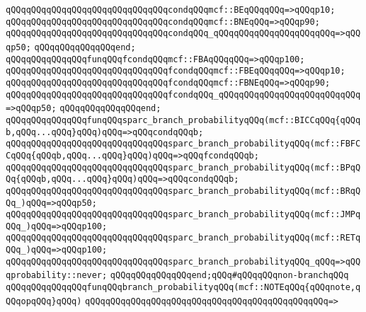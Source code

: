\verb|qQQqqQQqqQQqqQQqqQQqqQQqqQQqqQQqcondqQQqmcf::BEqQQqqQQq=>qQQqp10;|\newline
\verb|qQQqqQQqqQQqqQQqqQQqqQQqqQQqqQQqcondqQQqmcf::BNEqQQq=>qQQqp90;|\newline
\verb|qQQqqQQqqQQqqQQqqQQqqQQqqQQqqQQqcondqQQq_qQQqqQQqqQQqqQQqqQQqqQQq=>qQQqp50;|\newline
\verb|qQQqqQQqqQQqqQQqend;|\newline
\newline
\verb|qQQqqQQqqQQqqQQqfunqQQqfcondqQQqmcf::FBAqQQqqQQq=>qQQqp100;|\newline
\verb|qQQqqQQqqQQqqQQqqQQqqQQqqQQqqQQqfcondqQQqmcf::FBEqQQqqQQq=>qQQqp10;|\newline
\verb|qQQqqQQqqQQqqQQqqQQqqQQqqQQqqQQqfcondqQQqmcf::FBNEqQQq=>qQQqp90;|\newline
\verb|qQQqqQQqqQQqqQQqqQQqqQQqqQQqqQQqfcondqQQq_qQQqqQQqqQQqqQQqqQQqqQQqqQQq=>qQQqp50;|\newline
\verb|qQQqqQQqqQQqqQQqend;|\newline
\newline
\verb|qQQqqQQqqQQqqQQqfunqQQqsparc_branch_probabilityqQQq(mcf::BICCqQQq{qQQqb,qQQq...qQQq}qQQq)qQQq=>qQQqcondqQQqb;|\newline
\verb|qQQqqQQqqQQqqQQqqQQqqQQqqQQqqQQqsparc_branch_probabilityqQQq(mcf::FBFCCqQQq{qQQqb,qQQq...qQQq}qQQq)qQQq=>qQQqfcondqQQqb;|\newline
\verb|qQQqqQQqqQQqqQQqqQQqqQQqqQQqqQQqsparc_branch_probabilityqQQq(mcf::BPqQQq{qQQqb,qQQq...qQQq}qQQq)qQQq=>qQQqcondqQQqb;|\newline
\verb|qQQqqQQqqQQqqQQqqQQqqQQqqQQqqQQqsparc_branch_probabilityqQQq(mcf::BRqQQq_)qQQq=>qQQqp50;|\newline
\verb|qQQqqQQqqQQqqQQqqQQqqQQqqQQqqQQqsparc_branch_probabilityqQQq(mcf::JMPqQQq_)qQQq=>qQQqp100;|\newline
\verb|qQQqqQQqqQQqqQQqqQQqqQQqqQQqqQQqsparc_branch_probabilityqQQq(mcf::RETqQQq_)qQQq=>qQQqp100;|\newline
\verb|qQQqqQQqqQQqqQQqqQQqqQQqqQQqqQQqsparc_branch_probabilityqQQq_qQQq=>qQQqprobability::never;|\newline
\verb|qQQqqQQqqQQqqQQqend;qQQq#qQQqqQQqnon-branchqQQq|\newline
\newline
\verb|qQQqqQQqqQQqqQQqfunqQQqbranch_probabilityqQQq(mcf::NOTEqQQq{qQQqnote,qQQqopqQQq}qQQq)|\newline
\verb|qQQqqQQqqQQqqQQqqQQqqQQqqQQqqQQqqQQqqQQqqQQqqQQq=>|\newline
